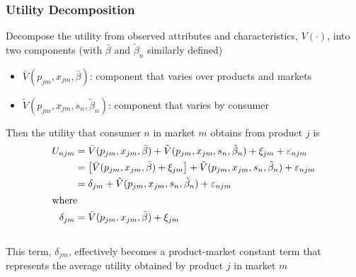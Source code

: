 \documentclass{beamer}
\begin{document}
\begin{frame}\frametitle{Utility Decomposition}
    Decompose the utility from observed attributes and characteristics, $V(\cdot)$, into two components (with $\bar{\beta}$ and $\tilde{\beta}_n$ similarly defined)
    \begin{itemize}
        \item $\bar{V}(p_{jm}, x_{jm}, \bar{\beta})$: component that varies over products and markets
        \item $\tilde{V}(p_{jm}, x_{jm}, s_n, \tilde{\beta}_n)$: component that varies by consumer
    \end{itemize}
    \vspace{2ex}
    Then the utility that consumer $n$ in market $m$ obtains from product $j$ is
    \begin{align*}
        U_{njm} &= \bar{V}(p_{jm}, x_{jm}, \bar{\beta}) + \tilde{V}(p_{jm}, x_{jm}, s_n, \tilde{\beta}_n) + \xi_{jm} + \varepsilon_{njm} \\
        &= \left[ \bar{V}(p_{jm}, x_{jm}, \bar{\beta}) + \xi_{jm} \right] + \tilde{V}(p_{jm}, x_{jm}, s_n, \tilde{\beta}_n) + \varepsilon_{njm} \\
        &= \delta_{jm} + \tilde{V}(p_{jm}, x_{jm}, s_n, \tilde{\beta}_n) + \varepsilon_{njm} \\
        \intertext{where}
        \delta_{jm} &= \bar{V}(p_{jm}, x_{jm}, \bar{\beta}) + \xi_{jm}
    \end{align*} \\
    This term, $\delta_{jm}$, effectively becomes a product-market constant term that represents the average utility obtained by product $j$ in market $m$
\end{frame}
\end{document}
